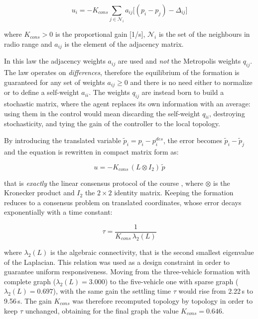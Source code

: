 \documentclass[conference,9pt]{IEEEtran}
\begin{document}
\begin{equation}
u_i = -K_{cons} \sum_{j \in \mathcal{N}_i} a_{ij} \Big[(p_i - p_j) - \Delta_{ij}\Big]
\label{eq:consenso}
\end{equation}

where $K_{cons} > 0$ is the proportional gain [1/s], $\mathcal{N}_i$ is the set
of the neighbours in radio range and $a_{ij}$ is the element of the adjacency
matrix.

In this law the adjacency weights $a_{ij}$ are used and \emph{not} the
Metropolis weights $q_{ij}$. The law operates on \emph{differences}, therefore
the equilibrium of the formation is guaranteed for any set of weights
$a_{ij} \ge 0$ and there is no need either to normalize or to define a
self-weight $a_{ii}$. The weights $q_{ij}$ are instead born to build a
stochastic matrix, where the agent replaces its own information with an
average: using them in the control would mean discarding the self-weight
$q_{ii}$, destroying stochasticity, and tying the gain of the controller to the
local topology.

By introducing the translated variable $\tilde p_i = p_i - p_i^{des}$, the
error becomes $\tilde p_i - \tilde p_j$ and the equation is rewritten in
compact matrix form as:

\begin{equation}
u = -K_{cons}\,(L \otimes I_2)\,\tilde p
\label{eq:consenso_matriciale}
\end{equation}

that is \emph{exactly} the linear consensus protocol of the course
\cite{fontanelli_notes}, where $\otimes$ is the Kronecker product and $I_2$ the
$2\times 2$ identity matrix. Keeping the formation reduces to a consensus
problem on translated coordinates, whose error decays exponentially with a time
constant:

\begin{equation}
\tau = \frac{1}{K_{cons}\,\lambda_2(L)}
\label{eq:tau}
\end{equation}

where $\lambda_2(L)$ is the algebraic connectivity, that is the second smallest
eigenvalue of the Laplacian. This relation was used as a design constraint in
order to guarantee uniform responsiveness. Moving from the three-vehicle
formation with complete graph ($\lambda_2(L) = 3.000$) to the five-vehicle one
with sparse graph ($\lambda_2(L) = 0.697$), with the same gain the settling
time $\tau$ would rise from 2.22\,s to 9.56\,s. The gain $K_{cons}$ was
therefore recomputed topology by topology in order to keep $\tau$ unchanged,
obtaining for the final graph the value $K_{cons} = 0.646$.
\end{document}
